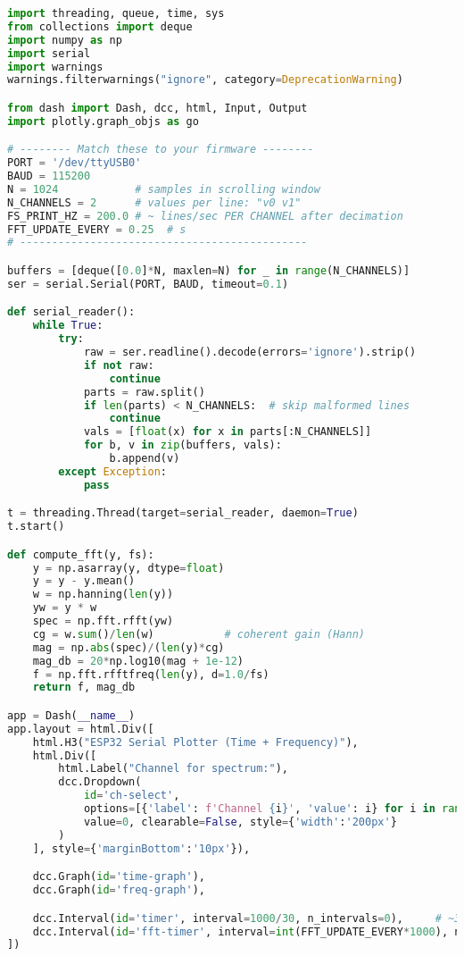 \documentclass[11pt]{article}
\begin{document}
\begin{lstlisting}[language=Python, caption={Dash serial plotter (time + spectrum)}]
import threading, queue, time, sys
from collections import deque
import numpy as np
import serial
import warnings
warnings.filterwarnings("ignore", category=DeprecationWarning)

from dash import Dash, dcc, html, Input, Output
import plotly.graph_objs as go

# -------- Match these to your firmware --------
PORT = '/dev/ttyUSB0'
BAUD = 115200
N = 1024            # samples in scrolling window
N_CHANNELS = 2      # values per line: "v0 v1"
FS_PRINT_HZ = 200.0 # ~ lines/sec PER CHANNEL after decimation
FFT_UPDATE_EVERY = 0.25  # s
# ---------------------------------------------

buffers = [deque([0.0]*N, maxlen=N) for _ in range(N_CHANNELS)]
ser = serial.Serial(PORT, BAUD, timeout=0.1)

def serial_reader():
    while True:
        try:
            raw = ser.readline().decode(errors='ignore').strip()
            if not raw:
                continue
            parts = raw.split()
            if len(parts) < N_CHANNELS:  # skip malformed lines
                continue
            vals = [float(x) for x in parts[:N_CHANNELS]]
            for b, v in zip(buffers, vals):
                b.append(v)
        except Exception:
            pass

t = threading.Thread(target=serial_reader, daemon=True)
t.start()

def compute_fft(y, fs):
    y = np.asarray(y, dtype=float)
    y = y - y.mean()
    w = np.hanning(len(y))
    yw = y * w
    spec = np.fft.rfft(yw)
    cg = w.sum()/len(w)           # coherent gain (Hann)
    mag = np.abs(spec)/(len(y)*cg)
    mag_db = 20*np.log10(mag + 1e-12)
    f = np.fft.rfftfreq(len(y), d=1.0/fs)
    return f, mag_db

app = Dash(__name__)
app.layout = html.Div([
    html.H3("ESP32 Serial Plotter (Time + Frequency)"),
    html.Div([
        html.Label("Channel for spectrum:"),
        dcc.Dropdown(
            id='ch-select',
            options=[{'label': f'Channel {i}', 'value': i} for i in range(N_CHANNELS)],
            value=0, clearable=False, style={'width':'200px'}
        )
    ], style={'marginBottom':'10px'}),

    dcc.Graph(id='time-graph'),
    dcc.Graph(id='freq-graph'),

    dcc.Interval(id='timer', interval=1000/30, n_intervals=0),     # ~30 FPS
    dcc.Interval(id='fft-timer', interval=int(FFT_UPDATE_EVERY*1000), n_intervals=0)
])


\end{lstlisting}
\end{document}
